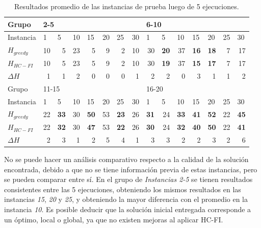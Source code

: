 \documentclass[letter, 10pt]{article}
\begin{document}
\begin{table}[H]
\centering
\begin{tabular}{|l|rrrrrrr|rrrrrrr|}
\hline
Grupo & \multicolumn{7}{l|}{2-5} & \multicolumn{7}{l|}{6-10} \\ \hline
Instancia & \multicolumn{1}{l}{1} & \multicolumn{1}{l}{5} & \multicolumn{1}{l}{10} & \multicolumn{1}{l}{15} & \multicolumn{1}{l}{20} & \multicolumn{1}{l}{25} & \multicolumn{1}{l|}{30} & \multicolumn{1}{l}{1} & \multicolumn{1}{l}{5} & \multicolumn{1}{l}{10} & \multicolumn{1}{l}{15} & \multicolumn{1}{l}{20} & \multicolumn{1}{l}{25} & \multicolumn{1}{l|}{30} \\ \hline
$H_{greedy}$ & 10 & 5 & 23 & 5 & 9 & 2 & 10 & 30 & \textbf{20} & 37 & \textbf{16} & \textbf{18} & 7 & 17 \\ \hline
$H_{HC-FI}$ & 10 & 5 & 23 & 5 & 9 & 2 & 10 & 30 & \textbf{19} & 37 & \textbf{15} & \textbf{17} & 7 & 17 \\ \hline
$\Delta H$ & 1 & 1 & 2 & 0 & 0 & 0 & 1 & 2 & 2 & 0 & 3 & 1 & 1 & 2 \\ \hline
Grupo & \multicolumn{7}{l|}{11-15} & \multicolumn{7}{l|}{16-20} \\ \hline
Instancia & \multicolumn{1}{l}{1} & \multicolumn{1}{l}{5} & \multicolumn{1}{l}{10} & \multicolumn{1}{l}{15} & \multicolumn{1}{l}{20} & \multicolumn{1}{l}{25} & \multicolumn{1}{l|}{30} & \multicolumn{1}{l}{1} & \multicolumn{1}{l}{5} & \multicolumn{1}{l}{10} & \multicolumn{1}{l}{15} & \multicolumn{1}{l}{20} & \multicolumn{1}{l}{25} & \multicolumn{1}{l|}{30} \\ \hline
$H_{greedy}$ & 22 & \textbf{33} & 30 & \textbf{50} & 53 & \textbf{23} & 26 & \textbf{31} & 24 & \textbf{33} & \textbf{41} & \textbf{52} & 22 & \textbf{45} \\ \hline
$H_{HC-FI}$ & 22 & \textbf{32} & 30 & \textbf{47} & 53 & \textbf{22} & 26 & \textbf{30} & 24 & \textbf{32} & \textbf{40} & \textbf{50} & 22 & \textbf{41} \\ \hline

$\Delta H$ & 2 & 3 & 1 & 2 & 5 & 4 & 1 & 3 & 3 & 2 & 2 & 3 & 2 & 6 \\ \hline
\end{tabular}
\caption{Resultados promedio de las instancias de prueba luego de 5 ejecuciones.}
\label{tab:resultados_pruebas}
\end{table}

No se puede hacer un an\'alisis comparativo respecto a la calidad de la soluci\'on encontrada, debido a que no se tiene informaci\'on previa de estas instancias, pero se pueden comparar entre s\'i.
En el grupo de \emph{Instancias 2-5} se tienen resultados consistentes entre las 5 ejecuciones, obteniendo los mismos resultados en las instancias \emph{15}, \emph{20} y \emph{25}, y obteniendo la mayor diferencia con el promedio en la instancia \emph{10}. Es posible deducir que la soluci\'on inicial entregada corresponde a un \'optimo, local o global, ya que no existen mejoras al aplicar HC-FI.
\end{document}
